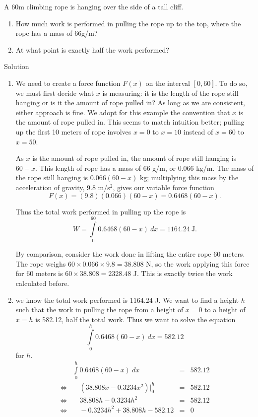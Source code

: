 \begin{example}\label{ex_work1}
A 60m climbing rope is hanging over the side of a tall cliff. 

\begin{enumerate}
\item How much work is performed in pulling the rope up to the top, where the rope has a mass of 66g/m? 
\item At what point is exactly half the work performed?
\end{enumerate}

Solution 

\begin{enumerate}
\item We need to create a force function $F(x)$ on the interval $[0,60]$. To do so, we must first decide what $x$ is measuring: it is the length of the rope still hanging or is it the amount of rope pulled in? As long as we are consistent, either approach is fine. We adopt for this example the convention that $x$ is the amount of rope pulled in. This seems to match intuition better; pulling up the first 10 meters of rope involves $x=0$ to $x=10$ instead of $x=60$ to $x=50$. 

As $x$ is the amount of rope pulled in, the amount of rope still hanging is $60-x$. This length of rope has a mass of 66 g/m, or $0.066$ kg/m. The mass of the rope still hanging is $0.066(60-x)$ kg; multiplying this mass by the acceleration of gravity, 9.8 m/s$^2$, gives our variable force function $$F(x) = (9.8)(0.066)(60-x) = 0.6468(60-x).$$

Thus the total work performed in pulling up the rope is 
$$W = \int\limits_0^{60} 0.6468(60-x)\ dx = 1164.24\ \text{J}.$$

By comparison, consider the work done in lifting the entire rope 60 meters. The rope weighs $60\times 0.066 \times 9.8 = 38.808$ N, so the work applying this force for 60 meters is $60\times 38.808 = 2328.48$ J. This is exactly twice the work calculated before.

\item we know the total work performed is $1164.24$ J. We want to find a height $h$ such that the work in pulling the rope from a height of $x=0$ to a height of $x=h$ is 582.12, half the total work. Thus we want to solve the equation
$$\int\limits_0^h 0.6468(60-x)\ dx = 582.12$$ 
for $h$. 
$$
\begin{array}{rrcl}
&\int\limits_0^h 0.6468(60-x)\ dx &=& 582.12 \\[0.2cm]
\Leftrightarrow&\quad\left(38.808x-0.3234x^2\right)\Big|_0^h &=&582.12 \\[0.2cm]
\Leftrightarrow&\quad38.808h-0.3234h^2 &=&582.12 \\[0.2cm]
\Leftrightarrow&\quad-0.3234h^2+38.808h-582.12 &=&0
\end{array}
$$


\end{enumerate}
\end{example}

